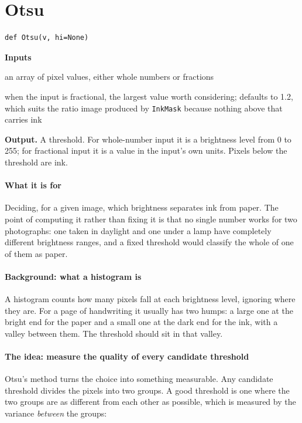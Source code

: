 \section{Otsu}
\begin{lstlisting}[style=sig]
def Otsu(v, hi=None)
\end{lstlisting}

\noindent\textbf{Inputs}
\begin{description}[leftmargin=2.2em,style=nextline,font=\normalfont\ttfamily]\setlength\itemsep{1pt}
  \item[{v}] \normalfont an array of pixel values, either whole numbers or fractions
  \item[{hi}] \normalfont when the input is fractional, the largest value worth considering; defaults to 1.2, which suits the ratio image produced by \texttt{InkMask} because nothing above that carries ink
\end{description}

\noindent\textbf{Output.} A threshold. For whole-number input it is a brightness level from 0 to 255; for fractional input it is a value in the input's own units. Pixels below the threshold are ink.


\paragraph{What it is for}
Deciding, for a given image, which brightness separates ink from paper. The point of computing it rather than fixing it is that no single number works for two photographs: one taken in daylight and one under a lamp have completely different brightness ranges, and a fixed threshold would classify the whole of one of them as paper.


\paragraph{Background: what a histogram is}
A histogram counts how many pixels fall at each brightness level, ignoring where they are. For a page of handwriting it usually has two humps: a large one at the bright end for the paper and a small one at the dark end for the ink, with a valley between them. The threshold should sit in that valley.


\paragraph{The idea: measure the quality of every candidate threshold}
Otsu's method \cite{otsu1979} turns the choice into something measurable. Any candidate threshold divides the pixels into two groups. A good threshold is one where the two groups are as different from each other as possible, which is measured by the variance \emph{between} the groups:


